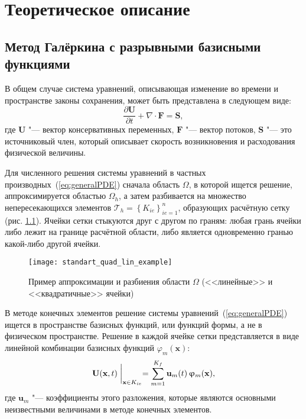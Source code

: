 
\chapter{Теоретическое описание}

\section{Метод Галёркина с разрывными базисными функциями} \label{sect:DG}

В общем случае система уравнений, описывающая изменение во времени и пространстве законы сохранения, может быть представлена в следующем виде:
\begin{equation}\label{eq:generalPDE}
\frac{\partial \mathbf U}{\partial t} + \nabla \cdot \mathbf F = \mathbf S,
\end{equation}
где \(\mathbf U\) "--- вектор консервативных переменных, \(\mathbf F\) "--- вектор потоков, \(\mathbf S\) "--- это источниковый член, который описывает скорость возникновения и расходования физической величины.

Для численного решения системы уравнений в частных производных~(\ref{eq:generalPDE}) сначала область \(\Omega\), в которой ищется решение, аппроксимируется областью \(\Omega_h\), а затем разбивается на множество непересекающихся элементов \(\mathcal{T}_h = \left \{ K_{ie} \right \}_{ie=1}^{n}\), образующих расчётную сетку (рис. \ref{pic:exampleapprox}). Ячейки сетки стыкуются друг с другом по граням: любая грань ячейки либо лежит на границе расчётной области, либо является одновременно гранью какой-либо другой ячейки.

\begin{figure}[h]
	\centering
	\texttt{[image: standart\_quad\_lin\_example]}
	\caption{Пример аппроксимации и разбиения области \(\Omega\) (<<линейные>> и <<квадратичные>> ячейки)}
	\label{pic:exampleapprox}
\end{figure}

В методе конечных элементов решение системы уравнений~(\ref{eq:generalPDE}) ищется в пространстве базисных функций, или функций формы, а не в физическом пространстве. Решение в каждой ячейке сетки представляется в виде линейной комбинации базисных функций \(\varphi_m(\mathbf x)\):
\begin{equation}\label{eq:Ureconstr}
\mathbf U(\mathbf x, t)\biggm|_{\mathbf{x} \in K_{ie}} = \sum\limits_{m=1}^{K_f} \mathbf u_m(t)\, \varphi_m(\mathbf x),
\end{equation}
где \(\mathbf u_m\) "--- коэффициенты этого разложения, которые являются основными неизвестными величинами в методе конечных элементов.

